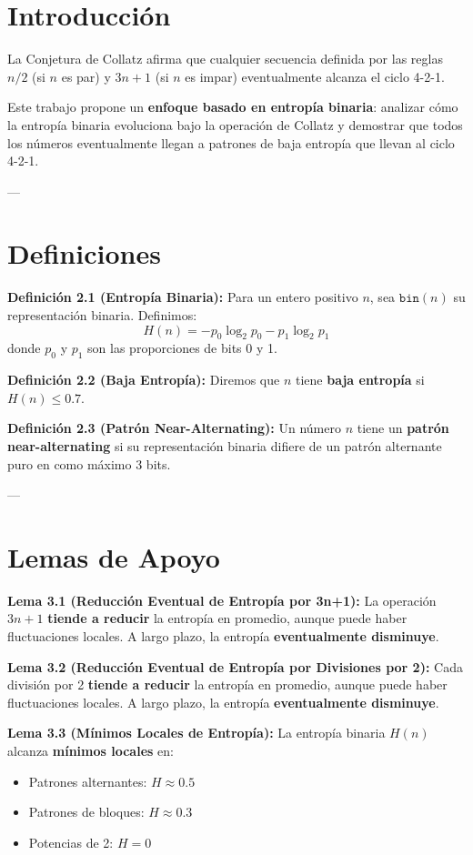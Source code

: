\documentclass[11pt,a4paper]{article}
\begin{document}
\section{Introducción}

La Conjetura de Collatz afirma que cualquier secuencia definida por las reglas \( n/2 \) (si \( n \) es par) y \( 3n + 1 \) (si \( n \) es impar) eventualmente alcanza el ciclo 4-2-1.

Este trabajo propone un \textbf{enfoque basado en entropía binaria}: analizar cómo la entropía binaria evoluciona bajo la operación de Collatz y demostrar que todos los números eventualmente llegan a patrones de baja entropía que llevan al ciclo 4-2-1.

---

\section{Definiciones}

\textbf{Definición 2.1 (Entropía Binaria):}
Para un entero positivo \( n \), sea \( \mathtt{bin}(n) \) su representación binaria. Definimos:
\[
H(n) = -p_0 \log_2 p_0 - p_1 \log_2 p_1
\]
donde \( p_0 \) y \( p_1 \) son las proporciones de bits 0 y 1.

\textbf{Definición 2.2 (Baja Entropía):}
Diremos que \( n \) tiene \textbf{baja entropía} si \( H(n) \leq 0.7 \).

\textbf{Definición 2.3 (Patrón Near-Alternating):}
Un número \( n \) tiene un \textbf{patrón near-alternating} si su representación binaria difiere de un patrón alternante puro en como máximo 3 bits.

---

\section{Lemas de Apoyo}

\textbf{Lema 3.1 (Reducción Eventual de Entropía por 3n+1):}
La operación \( 3n + 1 \) \textbf{tiende a reducir} la entropía en promedio, aunque puede haber fluctuaciones locales. A largo plazo, la entropía \textbf{eventualmente disminuye}.

\textbf{Lema 3.2 (Reducción Eventual de Entropía por Divisiones por 2):}
Cada división por 2 \textbf{tiende a reducir} la entropía en promedio, aunque puede haber fluctuaciones locales. A largo plazo, la entropía \textbf{eventualmente disminuye}.

\textbf{Lema 3.3 (Mínimos Locales de Entropía):}
La entropía binaria \( H(n) \) alcanza \textbf{mínimos locales} en:
\begin{itemize}
    \item Patrones alternantes: \( H \approx 0.5 \)
    \item Patrones de bloques: \( H \approx 0.3 \)
    \item Potencias de 2: \( H = 0 \)
\end{itemize}
\end{document}

